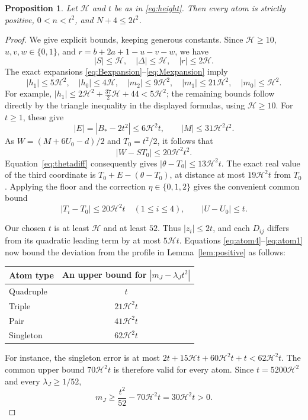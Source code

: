 \documentclass[11pt,a4paper]{article}
\newtheorem{proposition}[theorem]{Proposition}
\theoremstyle{definition}
\newcommand{\htf}{\mathcal H}
\begin{document}
\begin{proposition}\label{prop:effective}
Let $\htf$ and $t$ be as in \eqref{eq:height}. Then every atom is strictly
positive, $0<n<t^2$, and $N+4\le2t^2$.
\end{proposition}
\begin{proof}
We give explicit bounds, keeping generous constants. Since $\htf\ge10$,
$u,v,w\in\{0,1\}$, and $r=b+2a+1-u-v-w$, we have
\[
 |S|\le\htf,\quad |\Delta|\le\htf,\quad |r|\le2\htf.
\]
The exact expansions \eqref{eq:Bexpansion}--\eqref{eq:Mexpansion} imply
\begin{equation}\label{eq:boundscoeff}
 |h_1|\le5\htf^2,\quad |h_0|\le4\htf,\quad
 |m_2|\le9\htf^2,\quad |m_1|\le21\htf^2,\quad |m_0|\le\htf^2.
\end{equation}
For example, $|h_1|\le2\htf^2+\tfrac{37}{2}\htf+44<5\htf^2$;
the remaining bounds follow directly by the triangle inequality in the
displayed formulas, using $\htf\ge10$.
For $t\ge1$, these give
\[
 |E|=|B_*-2t^2|\le6\htf^2t,\qquad |M|\le31\htf^2t^2.
\]
As $W=(M+6U_0-d)/2$ and $T_0=t^2/2$, it follows that
\begin{equation}\label{eq:Wbound}
 |W-ST_0|\le20\htf^2t^2.
\end{equation}
Equation~\eqref{eq:thetadiff} consequently gives
$|\theta-T_0|\le13\htf^2t$. The exact real value of the third
coordinate is $T_0+E-(\theta-T_0)$, at distance at most
$19\htf^2t$ from $T_0$. Applying the floor and the correction
$\eta\in\{0,1,2\}$ gives the convenient common bound
\begin{equation}\label{eq:Tbound}
 |T_i-T_0|\le20\htf^2t\quad(1\le i\le4),\qquad |U-U_0|\le t.
\end{equation}

Our chosen $t$ is at least $\htf$ and at least $52$. Thus
$|z_i|\le2t$, and each $D_{ij}$ differs from its quadratic leading
term by at most $5\htf t$. Equations
\eqref{eq:atom4}--\eqref{eq:atom1} now bound the deviation from the
profile in Lemma~\ref{lem:positive} as follows:
\begin{center}
\begin{tabular}{lc}
\toprule
Atom type & An upper bound for $|m_J-\lambda_Jt^2|$\\
\midrule
Quadruple & $t$\\
Triple & $21\htf^2t$\\
Pair & $41\htf^2t$\\
Singleton & $62\htf^2t$\\
\bottomrule
\end{tabular}
\end{center}
For instance, the singleton error is at most
$2t+15\htf t+60\htf^2t+t<62\htf^2t$.
The common upper bound $70\htf^2t$ is therefore valid for every atom.
Since $t=5200\htf^2$ and every $\lambda_J\ge1/52$,
\begin{equation}\label{eq:strictmargin}
 m_J\ge\frac{t^2}{52}-70\htf^2t
      =30\htf^2t>0.
\end{equation}


\end{proof}
\end{document}
